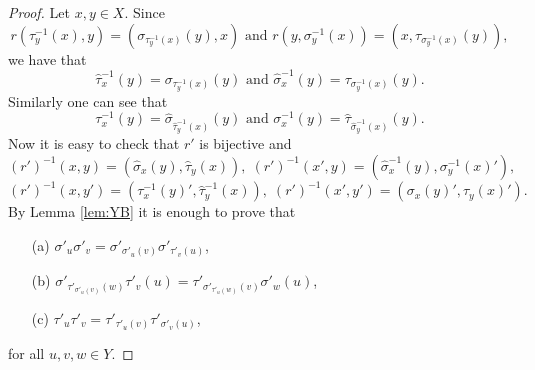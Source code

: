 \begin{proof}
Let $x,y\in X$. Since 
\[ r(\tau^{-1}_y(x),y)=(\sigma_{\tau^{-1}_y(x)}(y),x) \text{ and }
r(y,\sigma^{-1}_y(x))=(x,\tau_{\sigma^{-1}_y(x)}(y)),\] we have that
\[ \widehat{\tau}^{-1}_x(y)=\sigma_{\tau^{-1}_y(x)}(y)\text{ and } \widehat{\sigma}^{-1}_x(y)=\tau_{\sigma^{-1}_y(x)}(y).\]
Similarly one can see that
\[ \tau^{-1}_x(y)=\widehat{\sigma}_{\widehat{\tau}^{-1}_y(x)}(y)\text{ and } \sigma^{-1}_x(y)=\widehat{\tau}_{\widehat{\sigma}^{-1}_y(x)}(y).\]
Now it is easy to check that $r'$ is bijective and
\[ (r')^{-1}(x,y)=(\widehat{\sigma}_x(y),\widehat{\tau}_y(x)),\; (r')^{-1}(x',y)=(\widehat{\sigma}^{-1}_x(y),\sigma^{-1}_y(x)'),\] 
\[ (r')^{-1}(x,y')=(\tau^{-1}_x(y)',\widehat{\tau}^{-1}_y(x)), \; (r')^{-1}(x',y')=(\sigma_x(y)',\tau_y(x)').\]
By Lemma \ref{lem:YB} it is enough to prove that
\begin{itemize}
    \item[(a)] $\sigma'_{u}\sigma'_{v}=\sigma'_{\sigma'_u(v)}\sigma'_{\tau'_v(u)}$,
    \item[(b)]$\sigma'_{\tau'_{\sigma'_u(v)}(w)}\tau'_v(u)=\tau'_{\sigma'_{\tau'_u(w)}(v)}\sigma'_w(u)$,
    \item[(c)] $\tau'_{u}\tau'_{v}=\tau'_{\tau'_u(v)}\tau'_{\sigma'_v(u)}$,
\end{itemize}
for all $u,v,w\in Y$.


\end{proof}
